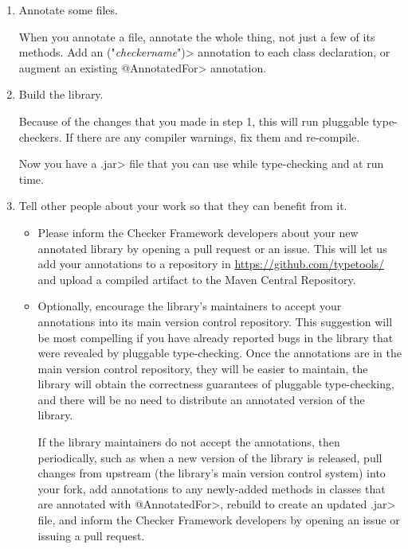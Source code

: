 \begin{enumerate}
\item Annotate some files.

  When you annotate a file, annotate the whole thing, not just a few of its
  methods.  Add an
  \<(\ttlcb"\emph{checkername}"\ttrcb)>
  annotation to each class declaration, or augment an existing \<@AnnotatedFor>
  annotation.

\item
  Build the library.

  Because of the changes that you made in step 1, this will run pluggable
  type-checkers.  If there are any compiler warnings, fix them and re-compile.

  Now you have a \<.jar> file that you can use while type-checking and at
  run time.

\item
  Tell other people about your work so that they can benefit from it.

  \begin{itemize}
  \item
    Please inform the Checker Framework developers
    about your new annotated library by opening a pull request or an issue.
    This will let us add your annotations to a repository in
    \url{https://github.com/typetools/} and upload a compiled artifact to
    the Maven Central Repository.

  \item
    Optionally, encourage the library's maintainers to accept your annotations into its
    main version control repository.  This suggestion will be most
    compelling if you have already reported bugs in the library that were
    revealed by pluggable type-checking.  Once the annotations are in the
    main version control repository, they will be easier
    to maintain, the library will obtain the correctness guarantees of
    pluggable type-checking, and there will be no need
    to distribute an annotated version of the library.

    If the library maintainers do not accept the annotations, then
    periodically, such as when a new version of the library is released,
    pull changes from upstream (the library's main version control system)
    into your fork, add annotations to any newly-added methods in classes
    that are annotated with \<@AnnotatedFor>, rebuild to create an updated
    \<.jar> file, and inform the Checker Framework developers by opening an
    issue or issuing a pull request.
  \end{itemize}

\end{enumerate}


